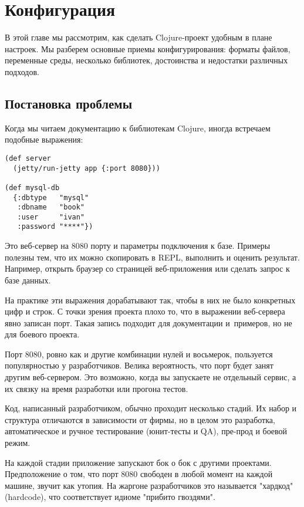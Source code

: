 \chapter{Конфигурация}

В этой главе мы рассмотрим, как сделать Clojure-проект удобным в плане
настроек. Мы разберем основные приемы конфигурирования: форматы файлов,
переменные среды, несколько библиотек, достоинства и недостатки различных
подходов.

\section{Постановка проблемы}

Когда мы читаем документацию к библиотекам Clojure, иногда встречаем подобные
выражения:

\begin{verbatim}
(def server
  (jetty/run-jetty app {:port 8080}))

(def mysql-db
  {:dbtype   "mysql"
   :dbname   "book"
   :user     "ivan"
   :password "****"})
\end{verbatim}

Это веб-сервер на 8080 порту и параметры подключения к базе. Примеры полезны
тем, что их можно скопировать в REPL, выполнить и оценить результат. Например,
открыть браузер со страницей веб-приложения или сделать запрос к базе данных.

На практике эти выражения дорабатывают так, чтобы в них не было конкретных цифр
и строк. С точки зрения проекта плохо то, что в выражении веб-сервера явно
записан порт. Такая запись подходит для документации и~примеров, но не для
боевого проекта.

Порт 8080, ровно как и другие комбинации нулей и восьмерок, пользуется
популярностью у разработчиков. Велика вероятность, что порт будет занят другим
веб-сервером. Это возможно, когда вы запускаете не отдельный сервис, а их связку
на время разработки или прогона тестов.

Код, написанный разработчиком, обычно проходит несколько стадий. Их набор и
структура отличаются в зависимости от фирмы, но в целом это разработка,
автоматическое и ручное тестирование (юнит-тесты и QA), пре-прод и боевой режим.

На каждой стадии приложение запускают бок о бок с другими
проектами. Предположение о том, что порт 8080 свободен в любой момент на каждой
машине, звучит как утопия. На жаргоне разработчиков это называется "хардкод"
(hardcode), что соответствует идиоме "прибито гвоздями".

